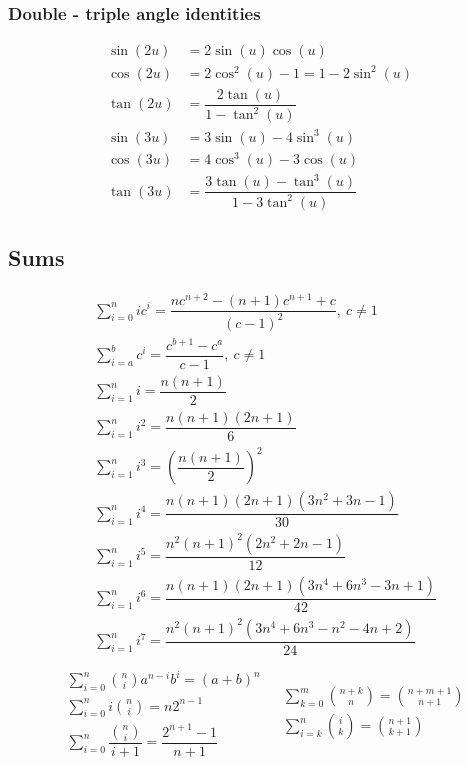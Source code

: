 \subsubsection{Double - triple angle identities}
\vspace{-0.75cm}
\begin{align*}
  \sin(2u) &= 2\sin(u)\cos(u) \\
  \cos(2u) &= 2\cos^2(u) - 1 = 1 - 2\sin^2(u) \\
  \tan(2u) &= \dfrac{2\tan(u)}{1-\tan^2(u)} \\
  \sin(3u) &= 3\sin(u) - 4\sin^3(u) \\
  \cos(3u) &= 4\cos^3(u) - 3\cos(u) \\
  \tan(3u) &= \dfrac{3\tan(u) - \tan^3(u)}{1 - 3\tan^2(u)}
\end{align*}

\subsection{Sums}
\vspace{-1.25cm}
\begin{align*}
  &\sum\limits_{i = 0}^{n} i c^i = \dfrac{nc^{n + 2} - (n + 1)c^{n + 1} + c}{(c - 1)^2},\ c \neq 1 \\
  &\sum\limits_{i = a}^{b} c^i = \dfrac{c^{b + 1} - c^{a}}{c - 1},\ c \neq 1 \\
  &\sum\limits_{i = 1}^{n} i = \dfrac{n(n + 1)}{2} \\
  &\sum\limits_{i = 1}^{n} i^2 = \dfrac{n(n + 1)(2n + 1)}{6} \\
  &\sum\limits_{i = 1}^{n} i^3 = \left(\dfrac{n(n + 1)}{2}\right)^2 \\
  &\sum\limits_{i = 1}^{n} i^4 = \dfrac{n(n + 1)(2n + 1)(3n^2 + 3n - 1)}{30} \\
  &\sum\limits_{i = 1}^{n} i^5 = \dfrac{n^2(n + 1)^2(2n^2 + 2n - 1)}{12} \\
  &\sum\limits_{i = 1}^{n} i^6 = \dfrac{n(n + 1)(2n + 1)(3n^4 + 6n^3 - 3n + 1)}{42} \\
  &\sum\limits_{i = 1}^{n} i^7 = \dfrac{n^2(n + 1)^2(3n^4 + 6n^3 - n^2 - 4n + 2)}{24} \\
\end{align*}
\begin{align*}
  \begin{split}
    &\sum\limits_{i = 0}^{n} {\binom{n}{i} a^{n - i} b^i} = (a + b)^n \\
    &\sum\limits_{i = 0}^{n} i \binom{n}{i} = n 2^{n - 1} \\
    &\sum\limits_{i = 0}^{n} \dfrac{\binom{n}{i}}{i + 1} = \dfrac{2^{n + 1} - 1}{n + 1} \\
  \end{split}
  \begin{split}
    &\sum\limits_{k = 0}^{m} \binom{n + k}{n} = \binom{n + m + 1}{n + 1} \\
    &\sum\limits_{i = k}^{n} \binom{i}{k} = \binom{n + 1}{k + 1} \\
  \end{split}
\end{align*}

